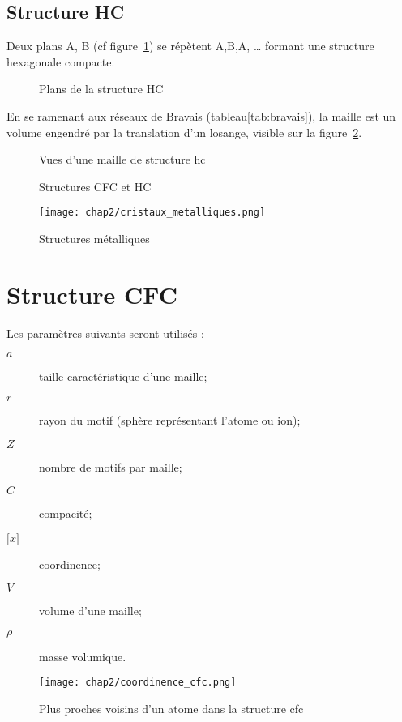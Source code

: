\subsection{Structure HC}
Deux plans A, B (cf figure~\ref{fig:plan_ab_hc}) se répètent A,B,A, \dots
formant une structure hexagonale compacte.
\begin{figure}
    \centering
    \qquad
    \caption{Plans de la structure HC}\label{fig:plan_ab_hc}
\end{figure}
En se ramenant aux réseaux de Bravais (tableau\ref{tab:bravais}),
la maille est un volume engendré par la translation d'un losange,
visible sur la figure~\ref{fig:maille_hc}.
\begin{figure}
    \centering
    \qquad
    \caption{Vues d'une maille de structure hc}\label{fig:maille_hc}
\end{figure}

\begin{figure}
    \centering
    \qquad
    \caption{Structures CFC et HC}
\end{figure}
\begin{figure}
    \centering
    \texttt{[image: chap2/cristaux\_metalliques.png]}
    \caption{Structures métalliques}
\end{figure}


\section{Structure CFC}
Les paramètres suivants seront utilisés :
\begin{description}
    \item[$a$] taille caractéristique d'une maille;
    \item[$r$] rayon du motif (sphère représentant l'atome ou ion);
    \item[$Z$] nombre de motifs par maille;
    \item[$C$] compacité;
    \item[$\lbrack x \rbrack$] coordinence;
    \item[$V$] volume d'une maille;
    \item[$\rho$] masse volumique.
\end{description}
\begin{figure}
    \centering
    \texttt{[image: chap2/coordinence\_cfc.png]}
    \caption{Plus proches voisins d'un atome dans la
        structure cfc}\label{fig:coordinence_cfc}
\end{figure}
